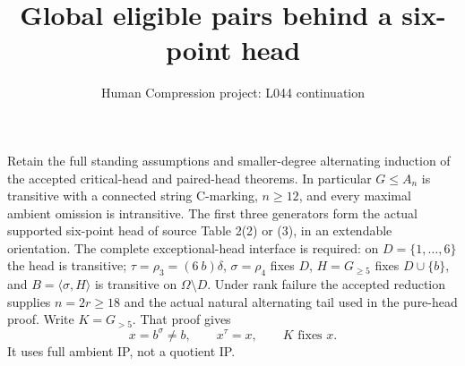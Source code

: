 \documentclass[11pt,a4paper]{article}
\title{Global eligible pairs behind a six-point head}
\author{Human Compression project: L044 continuation}
\date{}
\newcommand{\gen}[1]{\langle#1\rangle}
\begin{document}
\maketitle
Retain the full standing assumptions and smaller-degree alternating
induction of the accepted critical-head and paired-head theorems.
In particular $G\le A_n$ is transitive with a connected string
C-marking, $n\ge12$, and every maximal ambient omission is
intransitive. The first three generators form the actual supported
six-point head of source Table 2(2) or (3), in an extendable orientation.
The complete exceptional-head interface is required: on
$D=\{1,\ldots,6\}$ the head is transitive;
$\tau=\rho_3=(6\ b)\delta$, $\sigma=\rho_4$ fixes $D$,
$H=G_{\ge5}$ fixes $D\cup\{b\}$, and
$B=\gen{\sigma,H}$ is transitive on $\Omega\setminus D$.
Under rank failure the accepted reduction supplies $n=2r\ge18$
and the actual natural alternating tail used in the pure-head proof.
Write $K=G_{>5}$. That proof gives
\[
           x=b^\sigma\ne b,\qquad x^\tau=x,
                       \qquad K\text{ fixes }x.        \tag{1}
\]
It uses full ambient IP, not a quotient IP.
\end{document}
